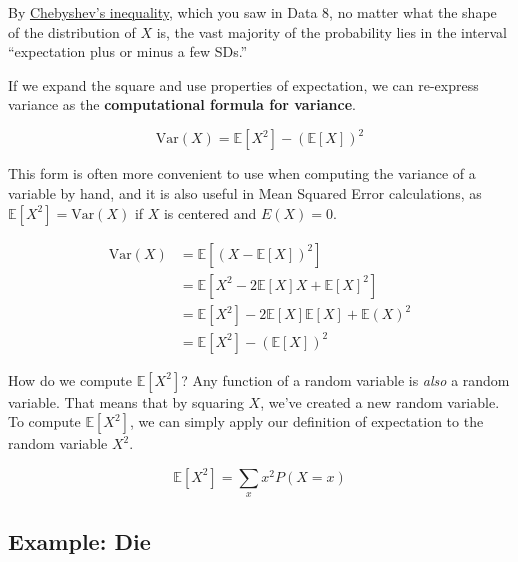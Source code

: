 \documentclass[
  letterpaper,
  DIV=11,
  numbers=noendperiod]{scrreprt}
\begin{document}
By
\href{https://www.inferentialthinking.com/chapters/14/2/Variability.html\#Chebychev's-Bounds}{Chebyshev's
inequality}, which you saw in Data 8, no matter what the shape of the
distribution of \(X\) is, the vast majority of the probability lies in
the interval ``expectation plus or minus a few SDs.''

If we expand the square and use properties of expectation, we can
re-express variance as the \textbf{computational formula for variance}.

\[\text{Var}(X) = \mathbb{E}[X^2] - (\mathbb{E}[X])^2\]

This form is often more convenient to use when computing the variance of
a variable by hand, and it is also useful in Mean Squared Error
calculations, as \(\mathbb{E}[X^2] = \text{Var}(X)\) if \(X\) is
centered and \(E(X)=0\).

\begin{tcolorbox}[enhanced jigsaw, arc=.35mm, left=2mm, toprule=.15mm, leftrule=.75mm, bottomrule=.15mm, colframe=quarto-callout-tip-color-frame, rightrule=.15mm, colbacktitle=quarto-callout-tip-color!10!white, opacitybacktitle=0.6, coltitle=black, bottomtitle=1mm, colback=white, toptitle=1mm, title=\textcolor{quarto-callout-tip-color}{\faLightbulb}\hspace{0.5em}{Proof}, breakable, opacityback=0, titlerule=0mm]

\[\begin{align}
   \text{Var}(X) &= \mathbb{E}[(X-\mathbb{E}[X])^2] \\
   &= \mathbb{E}[X^2 - 2\mathbb{E}[X]X + \mathbb{E}[X]^2] \\
   &= \mathbb{E}[X^2] - 2 \mathbb{E}[X]\mathbb{E}[X] + \mathbb{E}(X)^2\\
   &= \mathbb{E}[X^2] - (\mathbb{E}[X])^2
\end{align}\]

\end{tcolorbox}

How do we compute \(\mathbb{E}[X^2]\)? Any function of a random variable
is \emph{also} a random variable. That means that by squaring \(X\),
we've created a new random variable. To compute \(\mathbb{E}[X^2]\), we
can simply apply our definition of expectation to the random variable
\(X^2\).

\[\mathbb{E}[X^2] = \sum_{x} x^2 P(X = x)\]

\subsection{Example: Die}\label{example-die}
\end{document}
